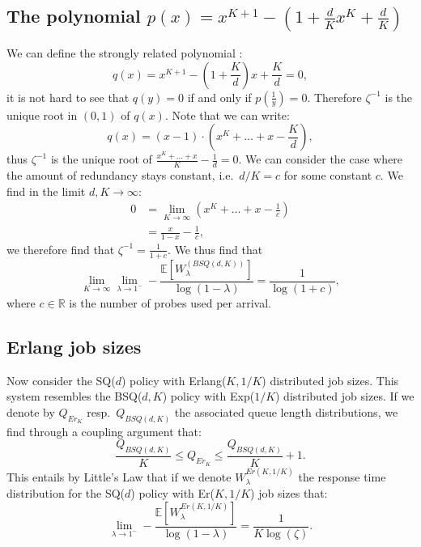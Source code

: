 \documentclass[12pt]{report}
\begin{document}
\subsection{The polynomial $p(x)=x^{K+1}-\left(1+\frac{d}{K}x^K + \frac{d}{K}\right)$}
We can define the strongly related polynomial :
$$
q(x)=x^{K+1} - \left( 1 + \frac{K}{d} \right) x + \frac{K}{d} = 0,
$$
it is not hard to see that $q(y) = 0 $ if and only if $p\left( \frac{1}{y} \right) = 0$. Therefore $\zeta^{-1}$ is the unique root in $(0,1)$ of $q(x)$. Note that we can write:
$$
q(x) = (x-1) \cdot (x^K + \ldots + x - \frac{K}{d} ),
$$
thus $\zeta^{-1}$ is the unique root of $\frac{x^K+\ldots + x}{K} - \frac{1}{d} = 0$. We can consider the case where the amount of redundancy stays constant, i.e.~$d/K=c$ for some constant $c$. We find in the limit $d, K\rightarrow \infty$:
\begin{align*}
0
&=
\lim_{K \rightarrow \infty} (x^K + \dots + x - \frac{1}{c} )\\
&= \frac{x}{1-x} - \frac{1}{c},
\end{align*}
we therefore find that $\zeta^{-1}= \frac{1}{1+c}$. We thus find that 
$$
\lim_{K\rightarrow \infty} \lim_{\lambda \rightarrow 1^-} - \frac{\mathbb{E}[W_\lambda^{(BSQ(d,K))}]}{\log(1-\lambda)} = \frac{1}{\log(1+c)},
$$
where $c \in \mathbb{R}$ is the number of probes used per arrival.

\subsection{Erlang job sizes}
Now consider the SQ($d$) policy with Erlang($K, 1/K$) distributed job sizes. This system resembles the BSQ($d,K$) policy with Exp($1/K$) distributed job sizes. If we denote by $Q_{Er_K}$ resp.~$Q_{BSQ(d,K)}$ the associated queue length distributions, we find through a coupling argument that:
$$
\frac{Q_{BSQ(d,K)}}{K} \leq Q_{Er_K} \leq \frac{Q_{BSQ(d,K)}}{K}+1.
$$
This entails by Little's Law that if we denote $W_\lambda^{Er(K,1/K)}$ the response time distribution for the SQ($d$) policy with Er($K, 1/K$) job sizes that:
$$
\lim_{\lambda \rightarrow 1^-} - \frac{\mathbb{E}[W_{\lambda}^{Er(K,1/K)}]}{\log(1-\lambda)} = \frac{1}{K\log(\zeta)}.
$$
\end{document}
